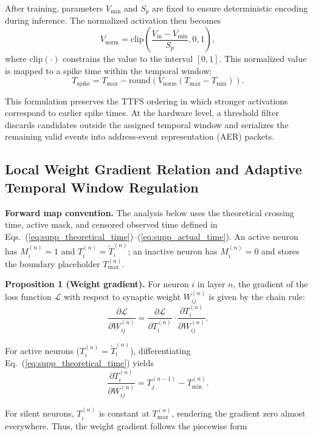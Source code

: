 ﻿\documentclass[12pt]{article}
\begin{document}
After training, parameters $V_{\min}$ and $S_p$ are fixed to ensure deterministic encoding during inference. The normalized activation then becomes
\begin{equation}
V_{\mathrm{norm}} = \mathrm{clip}\left(\frac{V_{\mathrm{in}}-V_{\min}}{S_p},0,1\right),
\end{equation}
where $\mathrm{clip}(\cdot)$ constrains the value to the interval $[0,1]$. This normalized value is mapped to a spike time within the temporal window:
\begin{equation}
T_{\mathrm{spike}} = T_{\max}-\mathrm{round}\left(V_{\mathrm{norm}}(T_{\max}-T_{\min})\right).
\end{equation}

This formulation preserves the TTFS ordering in which stronger activations correspond to earlier spike times. At the hardware level, a threshold filter discards candidates outside the assigned temporal window and serializes the remaining valid events into address-event representation (AER) packets.

\subsection{Local Weight Gradient Relation and Adaptive Temporal Window Regulation}

\textbf{Forward map convention.}
The analysis below uses the theoretical crossing time, active mask, and censored observed time defined in Eqs.~(\ref{eq:supp_theoretical_time})--(\ref{eq:supp_actual_time}). An active neuron has $M_i^{(n)}=1$ and $T_i^{(n)}=\tilde{T}_i^{(n)}$; an inactive neuron has $M_i^{(n)}=0$ and stores the boundary placeholder $T_{\max}^{(n)}$.

\textbf{Proposition 1 (Weight gradient).}
For neuron $i$ in layer $n$, the gradient of the loss function $\mathcal{L}$ with respect to synaptic weight $W_{ij}^{(n)}$ is given by the chain rule:
\begin{equation}
\frac{\partial \mathcal{L}}{\partial W_{ij}^{(n)}} =
\frac{\partial \mathcal{L}}{\partial T_i^{(n)}}
\cdot
\frac{\partial T_i^{(n)}}{\partial W_{ij}^{(n)}}.
\label{eq:supp_chain_rule}
\end{equation}

For active neurons ($T_i^{(n)}=\tilde{T}_i^{(n)}$), differentiating Eq.~(\ref{eq:supp_theoretical_time}) yields
\[
\frac{\partial T_i^{(n)}}{\partial W_{ij}^{(n)}} =
T_j^{(n-1)} - T_{\min}^{(n)}.
\]

For silent neurons, $T_i^{(n)}$ is constant at $T_{\max}^{(n)}$, rendering the gradient zero almost everywhere. Thus, the weight gradient follows the piecewise form
\end{document}
